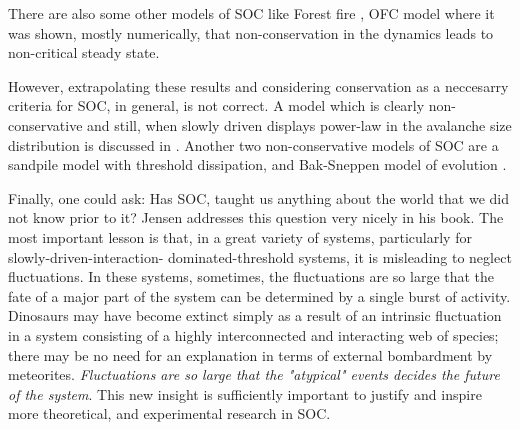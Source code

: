 \documentclass[11pt,a4paper]{book}
\begin{document}
\begin{itemize}
There are also some other models of SOC like Forest fire
\cite{forest}, OFC model \cite{ofc}
where it was shown, mostly numerically, that non-conservation in the
dynamics leads to non-critical steady state.

However, extrapolating these results and considering conservation as a
neccesarry criteria for SOC, in general, is not correct. A model which
is clearly non-conservative and still, when slowly driven displays
power-law in the avalanche size distribution is discussed in
\cite{ice}. Another two
non-conservative models of SOC are a sandpile model with threshold
dissipation\cite{thresdis}, and Bak-Sneppen model of evolution
\cite{sneppen2}.
\end{itemize}

Finally, one could ask: Has SOC, taught us anything about the world that
we did not know prior to it? Jensen addresses this question very
nicely in his book. The most important lesson is that, in a
great variety of systems, particularly for slowly-driven-interaction-
dominated-threshold systems, it is misleading to neglect
fluctuations. In these systems, sometimes, the fluctuations are so
large that the fate of a major part of the system can be determined by
a single burst of activity. Dinosaurs may have become extinct simply
as a result of an intrinsic fluctuation in a system consisting of a
highly interconnected and interacting web of species; there may be
no need for an explanation in terms of external bombardment by
meteorites. \textit{Fluctuations are so large that the "atypical" events
decides the future of the system}.
This new insight is sufficiently important to justify and inspire more
theoretical, and experimental research in SOC.
\end{document}
